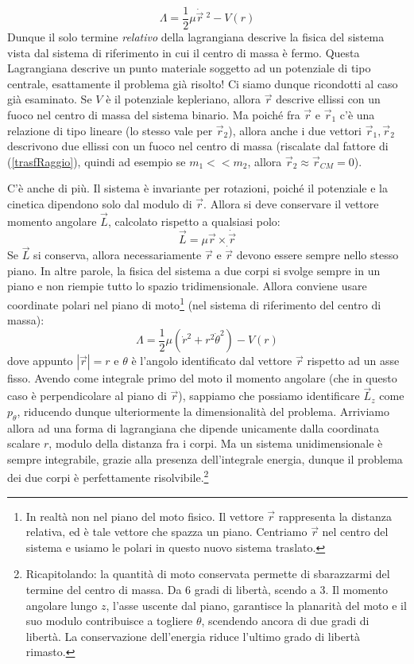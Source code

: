 \documentclass[a4paper,openany]{article}
\begin{document}
	$$
	\Lambda = \dfrac{1}{2}\mu\dot{\vec{r}}\>^{2} - V(r)
	$$
	Dunque il solo termine \textit{relativo} della lagrangiana descrive la fisica del sistema vista dal sistema di riferimento in cui il centro di massa è fermo. Questa Lagrangiana descrive un punto materiale soggetto ad un potenziale di tipo centrale, esattamente il problema già risolto! Ci siamo dunque ricondotti al caso già esaminato. Se $V$ è il potenziale kepleriano, allora $\vec{r}$ descrive ellissi con un fuoco nel centro di massa del sistema binario. Ma poiché fra $\vec{r}$ e $\vec{r}_1$ c'è una relazione di tipo lineare (lo stesso vale per $\vec{r}_2$), allora anche i due vettori $\vec{r}_1,\vec{r}_2$ descrivono due ellissi con un fuoco nel centro di massa (riscalate dal fattore di (\ref{trasfRaggio}), quindi ad esempio se $m_1 << m_2$, allora $\vec{r}_2 \approx \vec{r}_{CM} = 0$).
	
	
	C'è anche di più. Il sistema è invariante per rotazioni, poiché il potenziale e la cinetica dipendono solo dal modulo di $\vec{r}$. Allora si deve conservare il vettore momento angolare $\vec{L}$, calcolato rispetto a qualsiasi polo:
	$$
	\vec{L} = \mu \vec{r}\times\dot{\vec{r}}
	$$ 
	Se $\vec{L}$ si conserva, allora necessariamente $\vec{r} \mbox{ e } \dot{\vec{r}}$ devono essere sempre nello stesso piano. In altre parole, la fisica del sistema a due corpi si svolge sempre in un piano e non riempie tutto lo spazio tridimensionale. Allora conviene usare coordinate polari nel piano di moto\footnote{In realtà non nel piano del moto fisico. Il vettore $\vec{r}$ rappresenta la distanza relativa, ed è tale vettore che spazza un piano. Centriamo $\vec{r}$ nel centro del sistema e usiamo le polari in questo nuovo sistema traslato.} (nel sistema di riferimento del centro di massa):
	$$
	\Lambda = \dfrac{1}{2}\mu (\dot{r}^{2} + r^2\dot{\theta}^2) - V(r)
	$$
	dove appunto $|\vec{r}| = r$ e $\theta$ è l'angolo identificato dal vettore $\vec{r}$ rispetto ad un asse fisso. Avendo come integrale primo del moto il momento angolare (che in questo caso è perpendicolare al piano di $\vec{r}$), sappiamo che possiamo identificare $\vec{L}_{z}$ come $p_{\theta}$, riducendo dunque ulteriormente la dimensionalità del problema. Arriviamo allora ad una forma di lagrangiana che dipende unicamente dalla coordinata scalare $r$, modulo della distanza fra i corpi. Ma un sistema unidimensionale è sempre integrabile, grazie alla presenza dell'integrale energia, dunque il problema dei due corpi è perfettamente risolvibile.\footnote{Ricapitolando: la quantità di moto conservata permette di sbarazzarmi del termine del centro di massa. Da $6$ gradi di libertà, scendo a $3$. Il momento angolare lungo $z$, l'asse uscente dal piano, garantisce la planarità del moto e il suo modulo contribuisce a togliere $\theta$, scendendo ancora di due gradi di libertà. La conservazione dell'energia riduce l'ultimo grado di libertà rimasto.}
	
\end{document}
